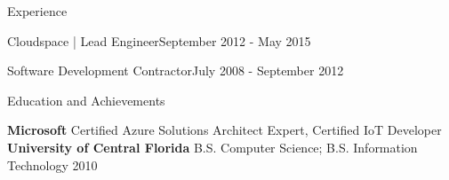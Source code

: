 \documentclass{resume} %
\begin{document}
\begin{rSection}{Experience}
\begin{rSubsection}{Cloudspace | Lead Engineer}{September 2012 - May 2015}{}{}
\end{rSubsection}


\begin{rSubsectionTitleOnly}{Software Development Contractor}{July 2008 - September 2012}{}{}
\end{rSubsectionTitleOnly}



\end{rSection}

\vspace{0.5em} %
\begin{rSection}{Education and Achievements}

    {\bf Microsoft } Certified Azure Solutions Architect Expert, Certified IoT Developer \\ 
    {\bf University of Central Florida } B.S. Computer Science; B.S. Information Technology  \hfill 2010

\end{rSection}
\end{document}
